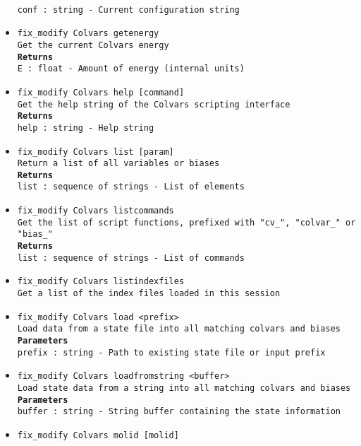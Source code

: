 \begin{itemize}
\\
\texttt{conf : string - Current configuration string}
\item \texttt{fix\_modify Colvars getenergy}
\\
\texttt{Get the current Colvars energy}
\\
\texttt{\textbf{Returns}}
\\
\texttt{E : float - Amount of energy (internal units)}
\item \texttt{fix\_modify Colvars help [command]}
\\
\texttt{Get the help string of the Colvars scripting interface}
\\
\texttt{\textbf{Returns}}
\\
\texttt{help : string - Help string}
\item \texttt{fix\_modify Colvars list [param]}
\\
\texttt{Return a list of all variables or biases}
\\
\texttt{\textbf{Returns}}
\\
\texttt{list : sequence of strings - List of elements}
\item \texttt{fix\_modify Colvars listcommands}
\\
\texttt{Get the list of script functions, prefixed with "cv\_", "colvar\_" or "bias\_"}
\\
\texttt{\textbf{Returns}}
\\
\texttt{list : sequence of strings - List of commands}
\item \texttt{fix\_modify Colvars listindexfiles}
\\
\texttt{Get a list of the index files loaded in this session}
\item \texttt{fix\_modify Colvars load <prefix>}
\\
\texttt{Load data from a state file into all matching colvars and biases}
\\
\texttt{\textbf{Parameters}}
\\
\texttt{prefix : string - Path to existing state file or input prefix}
\item \texttt{fix\_modify Colvars loadfromstring <buffer>}
\\
\texttt{Load state data from a string into all matching colvars and biases}
\\
\texttt{\textbf{Parameters}}
\\
\texttt{buffer : string - String buffer containing the state information}
\item \texttt{fix\_modify Colvars molid [molid]}
\\

\end{itemize}
